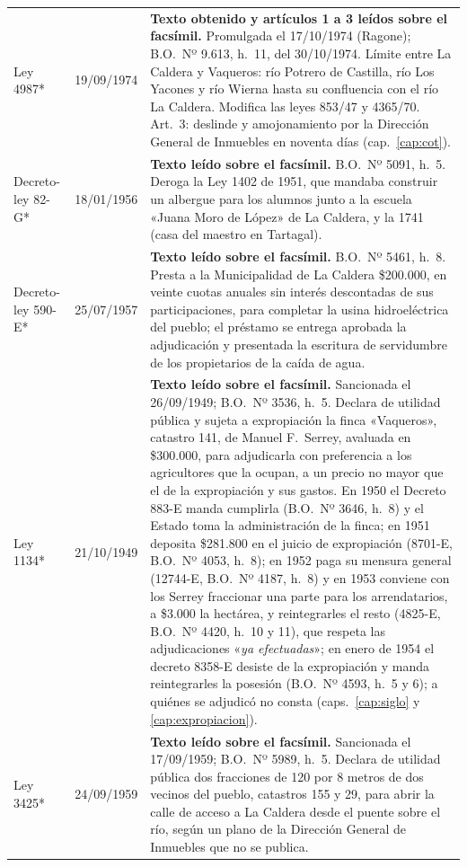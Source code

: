 \begin{longtable}{@{}p{3.2cm}p{1.9cm}p{7.9cm}@{}}
Ley 4987* & 19/09/1974 & \textbf{Texto obtenido y artículos 1 a 3 leídos sobre el facsímil.} Promulgada el 17/10/1974 (Ragone); B.O.\ Nº 9.613, h.\ 11, del 30/10/1974. Límite entre La Caldera y Vaqueros: río Potrero de Castilla, río Los Yacones y río Wierna hasta su confluencia con el río La Caldera. Modifica las leyes 853/47 y 4365/70. Art.\ 3: deslinde y amojonamiento por la Dirección General de Inmuebles en noventa días (cap.\ \ref{cap:cot}). \\
Decreto-ley 82-G* & 18/01/1956 & \textbf{Texto leído sobre el facsímil.} B.O.\ Nº 5091, h.\ 5. Deroga la Ley 1402 de 1951, que mandaba construir un albergue para los alumnos junto a la escuela «Juana Moro de López» de La Caldera, y la 1741 (casa del maestro en Tartagal). \\
Decreto-ley 590-E* & 25/07/1957 & \textbf{Texto leído sobre el facsímil.} B.O.\ Nº 5461, h.\ 8. Presta a la Municipalidad de La Caldera \$200.000, en veinte cuotas anuales sin interés descontadas de sus participaciones, para completar la usina hidroeléctrica del pueblo; el préstamo se entrega aprobada la adjudicación y presentada la escritura de servidumbre de los propietarios de la caída de agua. \\
Ley 1134* & 21/10/1949 & \textbf{Texto leído sobre el facsímil.} Sancionada el 26/09/1949; B.O.\ Nº 3536, h.\ 5. Declara de utilidad pública y sujeta a expropiación la finca «Vaqueros», catastro 141, de Manuel F.\ Serrey, avaluada en \$300.000, para adjudicarla con preferencia a los agricultores que la ocupan, a un precio no mayor que el de la expropiación y sus gastos. En 1950 el Decreto 883-E manda cumplirla (B.O.\ Nº 3646, h.\ 8) y el Estado toma la administración de la finca; en 1951 deposita \$281.800 en el juicio de expropiación (8701-E, B.O.\ Nº 4053, h.\ 8); en 1952 paga su mensura general (12744-E, B.O.\ Nº 4187, h.\ 8) y en 1953 conviene con los Serrey fraccionar una parte para los arrendatarios, a \$3.000 la hectárea, y reintegrarles el resto (4825-E, B.O.\ Nº 4420, h.\ 10 y 11), que respeta las adjudicaciones «\textit{ya efectuadas}»; en enero de 1954 el decreto 8358-E desiste de la expropiación y manda reintegrarles la posesión (B.O.\ Nº 4593, h.\ 5 y 6); a quiénes se adjudicó no consta (caps.\ \ref{cap:siglo} y \ref{cap:expropiacion}). \\
Ley 3425* & 24/09/1959 & \textbf{Texto leído sobre el facsímil.} Sancionada el 17/09/1959; B.O.\ Nº 5989, h.\ 5. Declara de utilidad pública dos fracciones de 120 por 8 metros de dos vecinos del pueblo, catastros 155 y 29, para abrir la calle de acceso a La Caldera desde el puente sobre el río, según un plano de la Dirección General de Inmuebles que no se publica. \\

\end{longtable}
